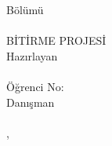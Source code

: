 \begin{titlepage}
\begin{center}

\vspace*{1cm}
{\Large \textbf{\university}}\\[0.3cm]
{\large \faculty}\\[0.2cm]
{\large \dept{} Bölümü}\\[2cm]

{\LARGE \textbf{\ttitle}}\\[2.5cm]

{\large BİTİRME PROJESİ}\\[2cm]

{\large Hazırlayan}\\[0.3cm]
{\Large \textbf{\authorname}}\\[0.2cm]
{\large Öğrenci No: \studentnumber}\\[2cm]

{\large Danışman}\\[0.3cm]
{\Large \textbf{\supname}}\\[2cm]

\vfill
{\large \univcity, \degreedate}

\end{center}
\end{titlepage}
